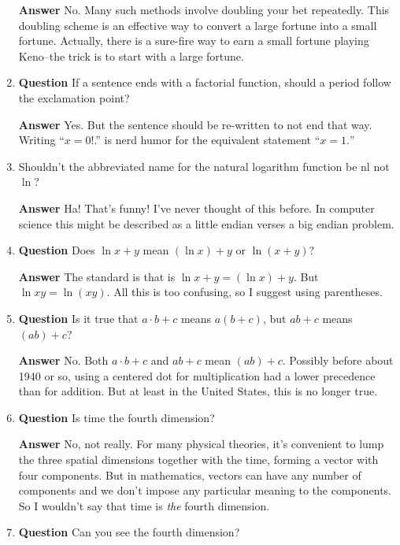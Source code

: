 \documentclass[11pt]{article}
\newcounter{ex}\setcounter{ex}{0}
\newcounter{cd}\setcounter{cd}{24}
\begin{document}
\begin{enumerate}
 \textbf{Answer} No. Many such methods involve doubling your bet repeatedly. This doubling scheme is 
an effective way to convert  a large fortune into a small fortune. Actually, there is a sure-fire 
way to earn a small fortune playing Keno--the trick is to start with a 
large fortune.

\item  \textbf{Question}  If a sentence ends with a factorial function, should a period 
follow the exclamation point?

  \textbf{Answer}  Yes. But the sentence should be re-written to not 
  end that way.  Writing ``\(x = 0!\).''  is nerd humor for the 
  equivalent statement ``\(x = 1.\)''
\
\item Shouldn't the abbreviated name for the natural logarithm function be $\mathrm{nl}$
      not $\ln$?
      
\textbf{Answer} Ha! That's funny! I've never thought of this before. In computer science
  this might be described as a  little endian verses a big endian problem.

\item  \textbf{Question} Does \(\ln x + y\) mean \((\ln x) + y \) or   \(\ln  (x + y)\)?

 \textbf{Answer} The standard is that is \(\ln x + y = (\ln x) + y \). But \( \ln x y = \ln(xy)\).  All this is too confusing, so I suggest using parentheses. 

\item  \textbf{Question}  Is it true that \(a \cdot b  + c\) means \(a (b+c)\), but \(a  b  + c\) means \((ab) + c\)?

 \textbf{Answer} No.  Both  \(a \cdot b  + c\) and \(a b + c\) mean  \((ab) + c\).  Possibly before about 1940 or so, using a centered dot for multiplication had a lower precedence than for addition. But at least in the United States, this is no longer true.



\item  \textbf{Question}  Is time the fourth dimension?

\textbf{Answer} No, not really.  For many physical theories, it's convenient to lump the three spatial dimensions together with the time, forming a vector with four components. But in mathematics, 
vectors can have any number of components and we don't impose any particular meaning to the components. So I wouldn't say that time is \emph{the} fourth dimension.

\item  \textbf{Question}  Can you see the fourth dimension?


\end{enumerate}
\end{document}
